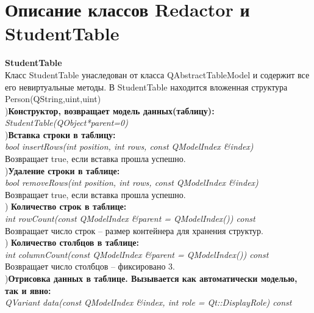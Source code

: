 \documentclass[a4paper]{article}
\begin{document}
	\newpage %
	{\section{Описание классов Redactor и StudentTable}
	{\LARGE \bf StudentTable}\\
	\hfill\break
	Класс StudentTable унаследован от класса QAbstractTableModel и содержит все его невиртуальные методы. В StudentTable находится вложенная структура Person(QString,uint,uint)\\
	\hfill\break
	\hfill {}){\bf Конструктор, возвращает модель данных(таблицу):}\\
	     \hfill \break
	     \textit{StudentTable(QObject*parent=0)}\\
	     \hfill \break
	     \hfill {}){\bf Вставка строки в таблицу:}\\
	     \hfill \break
	     \textit{bool insertRows(int position, int rows, const QModelIndex \&index)}\\
	     \hfill\break
	     Возвращает true, если вставка прошла успешно.\\
	     \hfill \break
	     \hfill {}){\bf Удаление строки в таблице:}\\
         \hfill \break	
	     \textit{bool removeRows(int position, int rows, const QModelIndex \&index)}\\
	     \hfill\break
	     Возвращает true, если вставка прошла успешно.\\
	     \hfill\break
	     \hfill{}) {\bf Количество строк в таблице:}\\
	     \hfill\break
	     \textit{int rowCount(const QModelIndex \&parent = QModelIndex()) const}\\
	     \hfill\break
	     Возвращает число строк – размер контейнера для хранения структур.\\
	     \hfill\break
	     \hfill{}) {\bf Количество столбцов в таблице:}\\
         \hfill\break	
	     \textit{int columnCount(const QModelIndex \&parent = QModelIndex()) const}\\
	     \hfill\break
	     Возвращает число столбцов – фиксировано 3.\\
	     \hfill\break
	     \hfill{}){\bf Отрисовка данных в таблице. Вызывается как автоматически моделью, так и явно:}\\
	     \hfill\break
	     \textit{QVariant data(const QModelIndex \&index, int role = Qt::DisplayRole) const}\\
}
\end{document}

